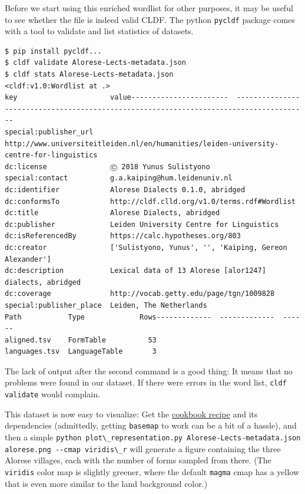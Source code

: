 \documentclass[
  a4paper,
  14pt,
  oneside,
  tablecaptionabove
]{scrbook}
\newcommand{\passthrough}[1]{#1}
\begin{document}
Before we start using this enriched wordlist for other purposes, it may
be useful to see whether the file is indeed valid CLDF. The python
\passthrough{\lstinline!pycldf!} package comes with a tool to validate
and list statistics of datasets.

\begin{lstlisting}
$ pip install pycldf...
$ cldf validate Alorese-Lects-metadata.json
$ cldf stats Alorese-Lects-metadata.json
<cldf:v1.0:Wordlist at .>
key                      value-----------------------  ---------------------------------------------------------------------------------------
special:publisher_url    http://www.universiteitleiden.nl/en/humanities/leiden-university-centre-for-linguistics
dc:license               Ⓒ 2018 Yunus Sulistyono
special:contact          g.a.kaiping@hum.leidenuniv.nl
dc:identifier            Alorese Dialects 0.1.0, abridged
dc:conformsTo            http://cldf.clld.org/v1.0/terms.rdf#Wordlist
dc:title                 Alorese Dialects, abridged
dc:publisher             Leiden University Centre for Linguistics
dc:isReferencedBy        https://calc.hypotheses.org/803
dc:creator               ['Sulistyono, Yunus', '', 'Kaiping, Gereon Alexander']
dc:description           Lexical data of 13 Alorese [alor1247] dialects, abridged
dc:coverage              http://vocab.getty.edu/page/tgn/1009828
special:publisher_place  Leiden, The Netherlands
Path           Type             Rows-------------  -------------  ------
aligned.tsv    FormTable          53
languages.tsv  LanguageTable       3
\end{lstlisting}

The lack of output after the second command is a good thing: It means
that no problems were found in our dataset. If there were errors in the
word list, \passthrough{\lstinline!cldf validate!} would complain.

This dataset is now easy to visualize: Get the
\href{https://github.com/cldf/cookbook/tree/master/recipes/plot_representation}{cookbook
recipe} and its dependencies (admittedly, getting
\passthrough{\lstinline!basemap!} to work can be a bit of a hassle), and
then a simple
\passthrough{\lstinline!python plot\_representation.py Alorese-Lects-metadata.json alorese.png --cmap viridis\_r!}
will generate a figure containing the three Alorese villages, each with
the number of forms sampled from there. (The
\passthrough{\lstinline!viridis!} color map is slightly greener, where
the default \passthrough{\lstinline!magma!} cmap has a yellow that is
even more similar to the land background color.)
\end{document}
